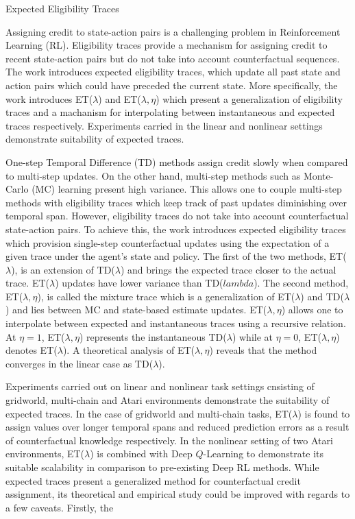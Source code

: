 \documentclass[11pt,letterpaper]{article}
\begin{document}
\begin{center}
  \large{Expected Eligibility Traces}
\end{center}

Assigning credit to state-action pairs is a challenging problem in Reinforcement Learning (RL). Eligibility traces provide a mechanism for assigning credit to recent state-action pairs but do not take into account counterfactual sequences. The work introduces expected eligibility traces, which update all past state and action pairs which could have preceded the current state. More specifically, the work introduces ET($\lambda$) and ET($\lambda,\eta$) which present a generalization of eligibility traces and a machanism for interpolating between instantaneous and expected traces respectively. Experiments carried in the linear and nonlinear settings demonstrate suitability of expected traces. 

One-step Temporal Difference (TD) methods assign credit slowly when compared to multi-step updates. On the other hand, multi-step methods such as Monte-Carlo (MC) learning present high variance. This allows one to couple multi-step methods with eligibility traces which keep track of past updates diminishing over temporal span. However, eligibility traces do not take into account counterfactual state-action pairs. To achieve this, the work introduces expected eligibility traces which provision single-step counterfactual updates using the expectation of a given trace under the agent's state and policy. The first of the two methods, ET($\lambda$), is an extension of TD($\lambda$) and brings the expected trace closer to the actual trace. ET($\lambda$) updates have lower variance than TD($lambda$). The second method, ET($\lambda,\eta$), is called the mixture trace which is a generalization of ET($\lambda$) and TD($\lambda$) and lies between MC and state-based estimate updates. ET($\lambda,\eta$) allows one to interpolate between expected and instantaneous traces using a recursive relation. At $\eta=1$, ET($\lambda,\eta$) represents the instantaneous TD($\lambda$) while at $\eta=0$, ET($\lambda,\eta$) denotes ET($\lambda$). A theoretical analysis of ET($\lambda,\eta$) reveals that the method converges in the linear case as TD($\lambda$). 

Experiments carried out on linear and nonlinear task settings cnsisting of gridworld, multi-chain and Atari environments demonstrate the suitability of expected traces. In the case of gridworld and multi-chain tasks, ET($\lambda$) is found to assign values over longer temporal spans and reduced prediction errors as a result of counterfactual knowledge respectively. In the nonlinear setting of two Atari environments, ET($\lambda$) is combined with Deep $Q$-Learning to demonstrate its suitable scalability in comparison to pre-existing Deep RL methods. While expected traces present a generalized method for counterfactual credit assignment, its theoretical and empirical study could be improved with regards to a few caveats. Firstly, the  
\end{document}
